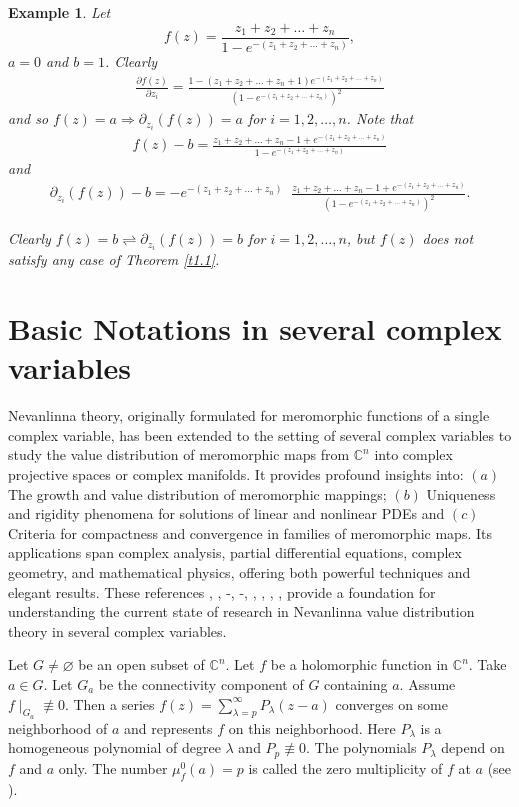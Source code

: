 \documentclass[11pt, reqno]{amsart}
\newtheorem*{cor A}{Corollary A}
\newtheorem*{cor B}{Corollary B}
\newtheorem{exm}{Example}[section]
\numberwithin{equation}{section}
\begin{document}
\begin{exm} Let 
\[f(z)=\frac{z_1+z_2+\ldots+z_n}{1-e^{-(z_1+z_2+\ldots+z_n)}},\]
$a=0$ and $b=1$. Clearly 
\begin{align*}
\frac{\partial f(z)}{\partial z_i}=\frac{1-(z_1+z_2+\ldots+z_n+1)e^{-(z_1+z_2+\ldots+z_n)}}{\left(1-e^{-(z_1+z_2+\ldots+z_n)}\right)^2}
\end{align*}
and so $f(z)=a \Rightarrow \partial_{z_i}(f(z))=a$ for $i=1,2,\ldots,n$. Note that
\begin{align*}
f(z)-b=\frac{z_1+z_2+\ldots+z_n-1+e^{-(z_1+z_2+\ldots+z_n)}}{1-e^{-(z_1+z_2+\ldots+z_n)}}
\end{align*}
and
\begin{align*}
\partial_{z_i}(f(z))-b=-e^{-(z_1+z_2+\ldots+z_n)}\;\;\frac{z_1+z_2+\ldots+z_n-1+e^{-(z_1+z_2+\ldots+z_n)}}{(1-e^{-(z_1+z_2+\ldots+z_n)})^{2}}.
\end{align*}

Clearly $f(z)=b \rightleftharpoons \partial_{z_i}(f(z))=b$ for $i=1,2,\ldots,n$, but $f(z)$ does not satisfy any case of Theorem \ref{t1.1}.
\end{exm}

\section{\bf{Basic Notations in several complex variables}}
Nevanlinna theory, originally formulated for meromorphic functions of a single complex variable, has been extended to the setting of several complex variables to study the value distribution of meromorphic maps from $\mathbb{C}^n$ into complex projective spaces or complex manifolds. It provides profound insights into: $(a)$ The growth and value distribution of meromorphic mappings; $(b)$ Uniqueness and rigidity phenomena for solutions of linear and nonlinear PDEs and $(c)$ Criteria for compactness and convergence in families of meromorphic maps. Its applications span complex analysis, partial differential equations, complex geometry, and mathematical physics, offering both powerful techniques and elegant results. These references \cite{Banerjee-Majumder-2026}, \cite{Cao-Korhonen-2016}, \cite{PVD1}-\cite{PVD3}, \cite{BQL1}-\cite{FL1}, \cite{MDP}, \cite{Majumder-2026}, \cite{Majumder-Sarkar-2026}, \cite{Majumder-Sarkar-2027}, \cite{GS2} provide a foundation for understanding the current state of research in Nevanlinna value distribution theory in several complex variables.

\medskip
Let $G\neq \varnothing$ be an open subset of $\mathbb{C}^n$. Let $f$ be a holomorphic function in $\mathbb{C}^n$.
Take $a\in G$. Let $G_a$ be the connectivity component of $G$ containing $a$. Assume $f\mid_{G_a}\not\equiv 0$. Then a series
$f(z)=\sum_{\lambda=p}^{\infty}P_{\lambda}(z-a)$ converges on some neighborhood of $a$ and represents $f$ on this neighborhood. Here 
$P_{\lambda}$ is a homogeneous polynomial of degree $\lambda$ and $P_{p}\not\equiv 0$. The polynomials $P_{\lambda}$ depend on $f$ and $a$ only. The number $\mu^0_f(a)=p$ is called the zero multiplicity of $f$ at $a$ (see \cite[pp. 12]{Stoll-1974}).
\end{document}
